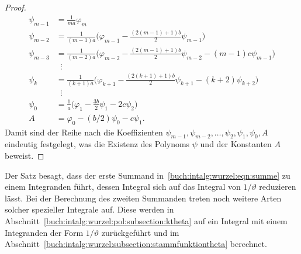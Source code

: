 \begin{proof}
\begin{align*}
\psi_{m-1}
&=
\frac{1}{ma}\varphi_m
\\
\psi_{m-2}
&=
\frac{1}{(m-1)a}\biggl(
\varphi_{m-1}
-
\frac{(2(m-1)+1)b}{2}\psi_{m-1}
\biggr)
\\
\psi_{m-3}
&=
\frac{1}{(m-2)a}\biggl(
\varphi_{m-2}
-
\frac{(2(m-1)+1)b}{2}\psi_{m-2}
-
(m-1)c\psi_{m-1}
\biggr)
\\[-5pt]
&\phantom{a}\vdots
\\[-3pt]
\psi_{k}
&=
\frac{1}{(k+1)a}
\biggl(
\varphi_{k+1}
-
\frac{(2(k+1)+1)b}{2}\psi_{k+1}
-
(k+2)
\psi_{k+2}
\biggr)
\\[-5pt]
&\phantom{a}\vdots
\\[-3pt]
\psi_0
&=
\frac{1}{a}\biggl(
\varphi_1
-
\frac{3b}{2}\psi_1
-
2c\psi_2
\biggr)
\\
A
&=
\varphi_0 -(b/2)\psi_0 - c\psi_1.
\end{align*}
Damit sind der Reihe nach die Koeffizienten
$\psi_{m-1},\psi_{m-2},\dots,\psi_2,\psi_1,\psi_0,A$
eindeutig festgelegt, was die Existenz des Polynoms $\psi$ und der
Konstanten $A$ beweist.
\end{proof}

Der Satz besagt, dass der erste Summand in~\eqref{buch:intalg:wurzel:eqn:summe}
zu einem Integranden führt, dessen Integral sich auf das Integral von
$1/\vartheta$ reduzieren lässt.
Bei der Berechnung des zweiten Summanden treten noch weitere Arten
solcher spezieller Integrale auf.
Diese werden in Abschnitt~\ref{buch:intalg:wurzel:pol:subsection:ktheta}
auf ein Integral mit einem Integranden der Form $1/\vartheta$ zurückgeführt
und im Abschnitt~\ref{buch:intalg:wurzel:subsection:stammfunktiontheta}
berechnet.

